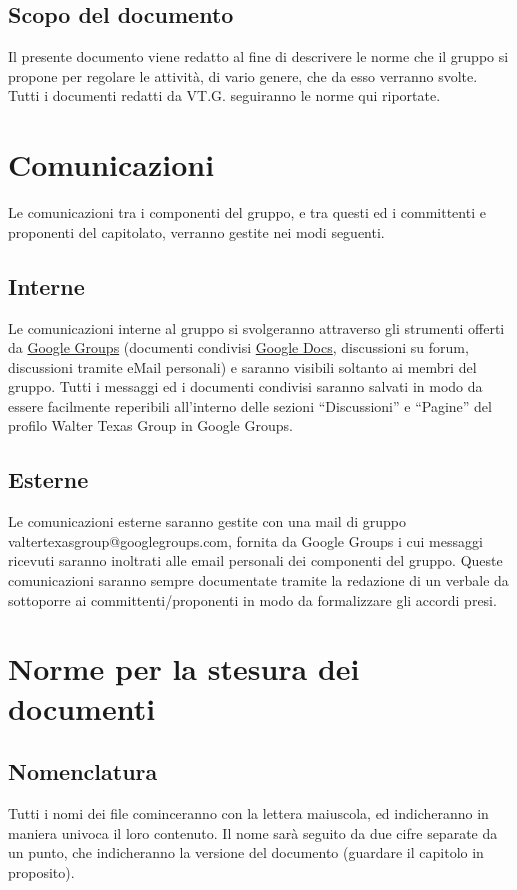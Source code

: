 \section{Scopo del documento}
Il presente documento viene redatto al fine di descrivere le norme che il gruppo
si propone per regolare le attivit\`a, di vario genere, che da esso
verranno svolte.
Tutti i documenti redatti da VT.G. seguiranno le norme qui riportate.


\chapter{Comunicazioni}
\thispagestyle{fancy}
Le comunicazioni tra i componenti del gruppo, e tra questi ed i committenti e
proponenti del capitolato, verranno gestite nei modi seguenti.

\section{Interne}
Le comunicazioni interne al gruppo si svolgeranno attraverso gli strumenti
offerti da \underline{Google Groups} (documenti condivisi \underline{Google
Docs}, discussioni su forum, discussioni tramite eMail personali) e saranno
visibili soltanto ai membri del gruppo. Tutti i messaggi ed i documenti
condivisi saranno salvati in modo da essere facilmente reperibili all'interno
delle sezioni ``Discussioni'' e ``Pagine'' del profilo Walter Texas Group in
Google Groups.

\section{Esterne}
Le comunicazioni esterne saranno gestite con una mail di gruppo
valtertexasgroup@googlegroups.com,  fornita da Google Groups i cui messaggi
ricevuti saranno inoltrati alle email personali dei componenti del gruppo.
Queste comunicazioni saranno sempre documentate tramite la redazione di un
verbale da sottoporre ai committenti/proponenti in modo da formalizzare gli
accordi presi.



\chapter{Norme per la stesura dei documenti}
\thispagestyle{fancy}

\section{Nomenclatura}
Tutti i nomi dei file cominceranno con la lettera maiuscola, ed indicheranno in
maniera univoca il loro contenuto. Il nome sar\`a seguito da due cifre separate da
un punto, che indicheranno la versione del documento (guardare il capitolo in proposito).

